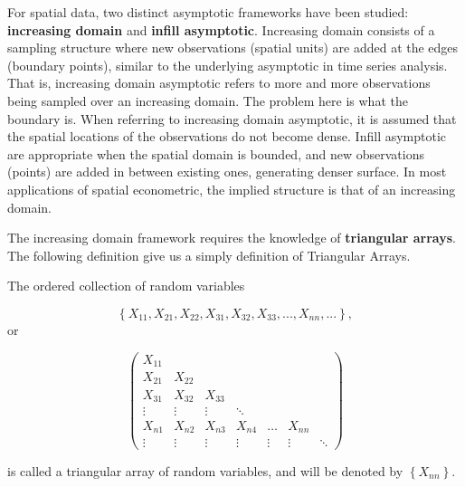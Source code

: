 \documentclass[english,12pt]{book}\usepackage[]{graphicx}\usepackage[]{xcolor}
\begin{document}
For spatial data, two distinct asymptotic frameworks have been studied: \textbf{increasing domain} and \textbf{infill asymptotic}. Increasing domain consists of a sampling structure where new observations (spatial units) are added at the edges (boundary points), similar to the underlying asymptotic in time series analysis. That is, increasing domain asymptotic refers to more and more observations being sampled over an increasing domain. The problem here is what the boundary is. When referring to increasing domain asymptotic, it is assumed that the spatial locations of the observations do not become dense. Infill asymptotic are appropriate when the spatial domain is bounded, and new observations (points) are added in between existing ones, generating denser surface. In most applications of spatial econometric, the implied structure is that of an increasing domain. 

The increasing domain framework requires the knowledge of \textbf{triangular arrays}.  The following definition give us a simply definition of Triangular Arrays. 

\begin{definition}\label{def:triangular-array} 
The ordered collection of random variables 

\begin{equation*}
\left\lbrace X_{11}, X_{21}, X_{22}, X_{31}, X_{32}, X_{33}, ... , X_{nn}, ...\right\rbrace,
\end{equation*}
%
or

\begin{equation*}
\begin{pmatrix}
X_{11} &        &        &        &        &        & \\
X_{21} & X_{22} &        &        &        &        & \\
X_{31} & X_{32} & X_{33} &        &        &        & \\
\vdots & \vdots & \vdots & \ddots &        &        & \\
X_{n1} & X_{n2} & X_{n3} & X_{n4} & \hdots & X_{nn} & \\
\vdots & \vdots & \vdots & \vdots & \vdots & \vdots & \ddots
\end{pmatrix}
\end{equation*}

is called a triangular array of random variables, and will be denoted by $\left\lbrace X_{nn}\right\rbrace$.
\end{definition}
\end{document}
